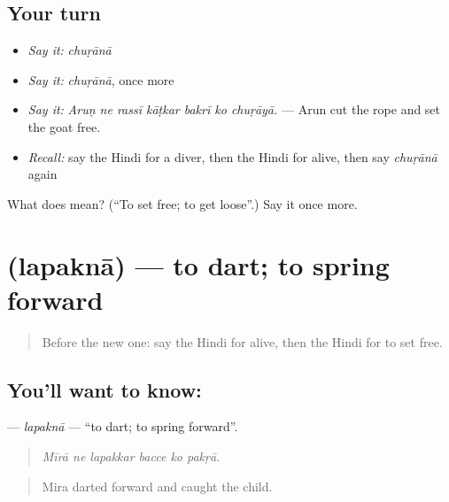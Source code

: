 \subsection*{Your turn}
\begin{itemize}
\raggedright
  \item \emph{Say it:} \emph{chuṛānā}
  \item \emph{Say it:} \emph{chuṛānā}, once more
  \item \emph{Say it:} \emph{Aruṇ ne rassī kāṭkar bakrī ko chuṛāyā.} — Arun cut the rope and set the goat free.
  \item \emph{Recall:} say the Hindi for a diver, then the Hindi for alive, then say \emph{chuṛānā} again
\end{itemize}

\begin{tcolorbox}[breakable,colback=teal!4,colframe=teal!35!black,title={Before you move on}]
What does  mean? (\textquotedblleft{}To set free; to get loose\textquotedblright{}.) Say it once more.
\end{tcolorbox}
\section[\texorpdfstring{\hi{लपकना} (lapaknā)}{लपकना (lapaknā)}]{ (lapaknā) — to dart; to spring forward}

\label{lesson:HI-C308-lapakna}



\begin{quote}
Before the new one: say the Hindi for alive, then the Hindi for to set free.
\end{quote}

\subsection*{You'll want to know: }
\textbf{} — \emph{lapaknā} — \textquotedblleft{}to dart; to spring forward\textquotedblright{}.

\begin{quote}
     
\end{quote}

\begin{quote}
\emph{Mīrā ne lapakkar bacce ko pakṛā.}
\end{quote}

\begin{quote}
Mira darted forward and caught the child.
\end{quote}


